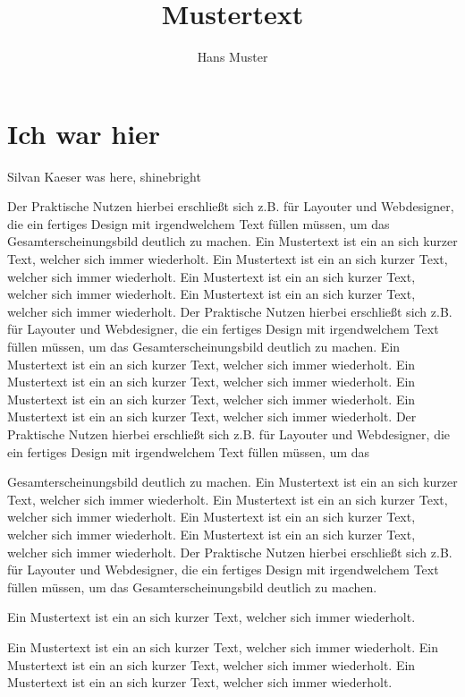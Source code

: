 \documentclass{article}
\title{Mustertext}
\author{Hans Muster}
\begin{document}
\maketitle
\section{Ich war hier}
Silvan Kaeser was here, shinebright

Der Praktische Nutzen hierbei erschließt sich z.B. für Layouter und Webdesigner, die ein fertiges Design mit irgendwelchem Text füllen müssen, um das Gesamterscheinungsbild deutlich zu machen. Ein Mustertext ist ein an sich kurzer Text, welcher sich immer wiederholt. Ein Mustertext ist ein an sich kurzer Text, welcher sich immer wiederholt.\cite{Illuminati}
Ein Mustertext ist ein an sich kurzer Text, welcher sich immer wiederholt. Ein Mustertext ist ein an sich kurzer Text, welcher sich immer wiederholt. Der Praktische Nutzen hierbei erschließt sich z.B. für Layouter und Webdesigner, die ein fertiges Design mit irgendwelchem Text füllen müssen, um das Gesamterscheinungsbild deutlich zu machen.\cite{Zoo} Ein Mustertext ist ein an sich kurzer Text, welcher sich immer wiederholt. Ein Mustertext ist ein an sich kurzer Text, welcher sich immer wiederholt. Ein Mustertext ist ein an sich kurzer Text, welcher sich immer wiederholt. Ein Mustertext ist ein an sich kurzer Text, welcher sich immer wiederholt. Der Praktische Nutzen hierbei erschließt sich z.B. für Layouter und Webdesigner, die ein fertiges Design mit irgendwelchem Text füllen müssen, um das

Gesamterscheinungsbild deutlich zu machen. Ein Mustertext ist ein an sich kurzer Text, welcher sich immer wiederholt. Ein Mustertext ist ein an sich kurzer Text, welcher sich immer wiederholt. Ein Mustertext ist ein an sich kurzer Text, welcher sich immer wiederholt. Ein Mustertext ist ein an sich kurzer Text, welcher sich immer wiederholt. Der Praktische Nutzen hierbei erschließt sich z.B. für Layouter und Webdesigner, die ein fertiges Design mit irgendwelchem Text füllen müssen, um das Gesamterscheinungsbild deutlich zu machen.\cite{Armee}

\begin{center}
    Ein Mustertext
    ist ein an
    sich kurzer
    Text,
    welcher
	sich immer wiederholt.
\end{center}
Ein Mustertext ist ein an sich kurzer Text, welcher sich immer wiederholt. Ein Mustertext ist ein an sich kurzer Text, welcher sich immer wiederholt. Ein Mustertext ist ein an sich kurzer Text, welcher sich immer wiederholt. 



\end{document}
